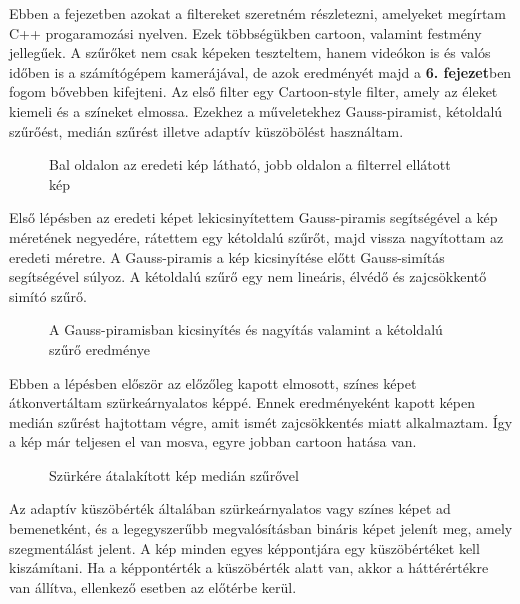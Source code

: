 
Ebben a fejezetben azokat a filtereket szeretném részletezni, amelyeket megírtam C++ progaramozási nyelven. Ezek többségükben cartoon, valamint festmény jellegűek. A szűrőket nem csak képeken teszteltem, hanem videókon is és valós időben is a számítógépem kamerájával, de azok eredményét majd a \textbf{6. fejezet}ben fogom bővebben kifejteni.
Az első filter egy Cartoon-style filter, amely az éleket kiemeli és a színeket elmossa. Ezekhez a műveletekhez Gauss-piramist, kétoldalú szűrőést, medián szűrést illetve adaptív küszöbölést használtam.
\begin{figure}[ht]
\centering
{}
\caption{Bal oldalon az eredeti kép látható, jobb oldalon a filterrel ellátott kép} 
\label{fig: cartoon1}
\end{figure}
Első lépésben az eredeti képet lekicsinyítettem Gauss-piramis segítségével a kép méretének negyedére, rátettem egy kétoldalú szűrőt, majd vissza nagyítottam az eredeti méretre. A Gauss-piramis a kép kicsinyítése előtt Gauss-simítás segítségével súlyoz. A kétoldalú szűrő egy nem lineáris, élvédő és zajcsökkentő simító szűrő.
\begin{figure}[ht]
\centering
{}
\caption{A Gauss-piramisban kicsinyítés és nagyítás valamint a kétoldalú szűrő eredménye } 
\label{fig: cartoon2}
\end{figure}
Ebben a lépésben először az előzőleg kapott elmosott, színes képet átkonvertáltam szürkeárnyalatos képpé. Ennek eredményeként kapott képen medián szűrést hajtottam végre, amit ismét zajcsökkentés miatt alkalmaztam. Így a kép már teljesen el van mosva, egyre jobban cartoon hatása van.
\begin{figure}[ht]
\centering
{}
\caption{Szürkére átalakított kép medián szűrővel } 
\label{fig: cartoon3}
\end{figure}
Az adaptív küszöbérték általában szürkeárnyalatos vagy színes képet ad bemenetként, és a legegyszerűbb megvalósításban bináris képet jelenít meg, amely szegmentálást jelent. A kép minden egyes képpontjára egy küszöbértéket kell kiszámítani. Ha a képpontérték a küszöbérték alatt van, akkor a háttérértékre van állítva, ellenkező esetben az előtérbe kerül.

